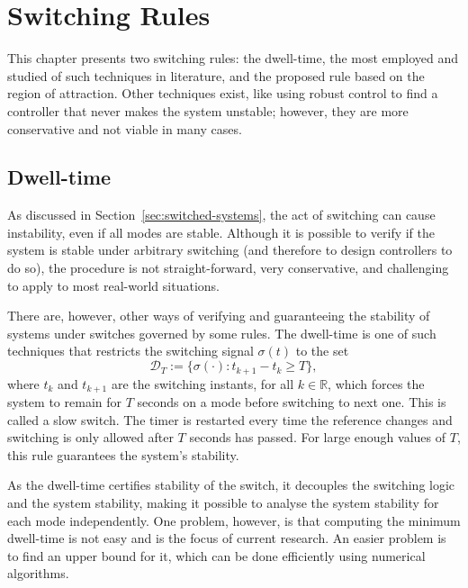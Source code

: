 
\chapter{Switching Rules}%
\label{chp:switching-rules}

This chapter presents two switching rules: the dwell-time, the most employed and
studied of such techniques in literature, and the proposed rule based on the
region of attraction. Other techniques exist, like using robust control to find
a controller that never makes the system unstable; however, they are more
conservative and not viable in many cases.

\section{Dwell-time}%
\label{sec:dwell-time}

As discussed in Section~\ref{sec:switched-systems}, the act of switching can
cause instability, even if all modes are stable. Although it is possible to
verify if the system is stable under arbitrary switching (and therefore to
design controllers to do so), the procedure is not straight-forward, very
conservative, and challenging to apply to most real-world situations.

There are, however, other ways of verifying and guaranteeing the stability of
systems under switches governed by some rules. The dwell-time is one of such
techniques that restricts the switching signal \(\sigma{}(t)\) to the set
%
\begin{equation}
	\mathcal{D}_{T} := \{\sigma(\cdot):t_{k+1}-t_{k}\ge{}T\},
\end{equation}
%
where \(t_{k}\) and \(t_{k+1}\) are the switching instants, for all
\(k\in{}\mathbb{R}\), which forces the system to remain for \(T\) seconds on a
mode before switching to next one. This is called a slow switch. The timer is
restarted every time the reference changes and switching is only allowed after
\(T\) seconds has passed.  For large enough values of \(T\), this rule
guarantees the system's stability.

As the dwell-time certifies stability of the switch, it decouples the switching
logic and the system stability, making it possible to analyse the system
stability for each mode independently. One problem, however, is that computing
the minimum dwell-time is not easy and is the focus of current research. An
easier problem is to find an upper bound for it, which can be done efficiently
using numerical algorithms.

